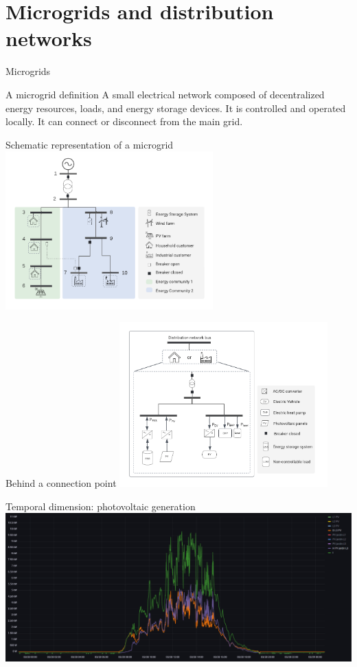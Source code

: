 \section{Microgrids and distribution networks}


\begin{frame}{Microgrids}

\begin{block}{A microgrid definition}
A  small electrical network composed of decentralized energy resources, loads, and energy storage devices. It is controlled and operated locally. It can connect or disconnect from the main grid.
\end{block}
\end{frame}

\begin{frame}{Schematic representation of a microgrid}
\centering
\includegraphics[width=0.6\textwidth]{distrib.pdf}
\end{frame}

\begin{frame}{Behind a connection point}
\centering
\includegraphics[width=0.6\textwidth]{grid_user.pdf}
\end{frame}

\begin{frame}{Temporal dimension: photovoltaic generation}
\centering
\includegraphics[width=\textwidth]{PV.png}
\end{frame}

